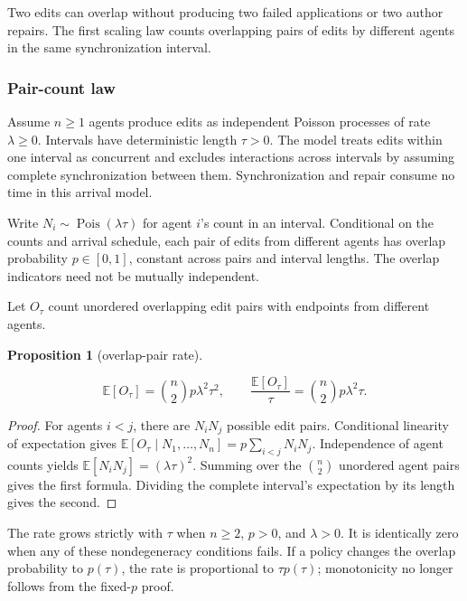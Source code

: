 \documentclass[pdflatex,sn-mathphys-ay]{sn-jnl}
\theoremstyle{thmstyleone}
\newtheorem{proposition}[theorem]{Proposition}
\theoremstyle{thmstylethree}
\begin{document}
\begin{appendices}
Two edits can overlap without producing two failed applications or two author repairs. The first scaling law counts overlapping pairs of edits by different agents in the same synchronization interval.

\subsubsection{Pair-count law}\label{app:pair-count-law}

Assume \(n\ge1\) agents produce edits as independent Poisson processes of rate \(\lambda\ge0\). Intervals have deterministic length \(\tau>0\). The model treats edits within one interval as concurrent and excludes interactions across intervals by assuming complete synchronization between them. Synchronization and repair consume no time in this arrival model.

Write \(N_i\sim\operatorname{Pois}(\lambda\tau)\) for agent \(i\)'s count in an interval. Conditional on the counts and arrival schedule, each pair of edits from different agents has overlap probability \(p\in[0,1]\), constant across pairs and interval lengths. The overlap indicators need not be mutually independent.

Let \(O_\tau\) count unordered overlapping edit pairs with endpoints from different agents.

\begin{proposition}[overlap-pair rate]\label{prop:overlap-pair-rate}

\[
\mathbb E[O_\tau]
=\binom n2p\lambda^2\tau^2,
\qquad
\frac{\mathbb E[O_\tau]}{\tau}
=\binom n2p\lambda^2\tau.
\]

\end{proposition}
\begin{proof}

For agents \(i<j\), there are \(N_iN_j\) possible edit pairs. Conditional linearity of expectation gives \(\mathbb E[O_\tau\mid N_1,\ldots,N_n]=p\sum_{i<j}N_iN_j\). Independence of agent counts yields \(\mathbb E[N_iN_j]=(\lambda\tau)^2\). Summing over the \(\binom n2\) unordered agent pairs gives the first formula. Dividing the complete interval's expectation by its length gives the second.

\end{proof}

The rate grows strictly with \(\tau\) when \(n\ge2\), \(p>0\), and \(\lambda>0\). It is identically zero when any of these nondegeneracy conditions fails. If a policy changes the overlap probability to \(p(\tau)\), the rate is proportional to \(\tau p(\tau)\); monotonicity no longer follows from the fixed-\(p\) proof.


\end{appendices}
\end{document}
